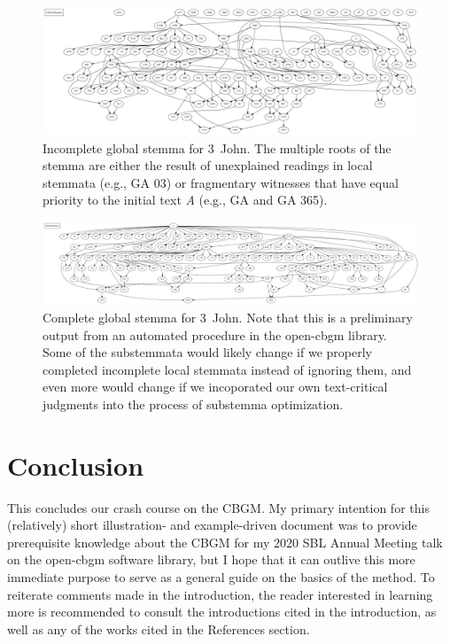 \documentclass[a4paper, 12pt]{article}
\begin{document}
	\begin{figure}
		\centering
		\includegraphics[width=\textwidth]{../graphics/global-stemma-incomplete.pdf}
		\caption{Incomplete global stemma for 3~John. The multiple roots of the stemma are either the result of unexplained readings in local stemmata (e.g., GA 03) or fragmentary witnesses that have equal priority to the initial text \emph{A} (e.g., GA  and GA 365).}
		\label{fig:global-stemma-incomplete}
	\end{figure}
	
	\begin{figure}
		\centering
		\includegraphics[width=\textwidth]{../graphics/global-stemma.pdf}
		\caption{Complete global stemma for 3~John. Note that this is a preliminary output from an automated procedure in the \textsf{open-cbgm} library. Some of the substemmata would likely change if we properly completed incomplete local stemmata instead of ignoring them, and even more would change if we incoporated our own text-critical judgments into the process of substemma optimization.}
		\label{fig:global-stemma}
	\end{figure}
	
	\newpage
	
	\section*{Conclusion}\label{sec:conclusion}
	This concludes our crash course on the CBGM. My primary intention for this (relatively) short illustration- and example-driven document was to provide prerequisite knowledge about the CBGM for my 2020 SBL Annual Meeting talk on the \textsf{open-cbgm} software library, but I hope that it can outlive this more immediate purpose to serve as a general guide on the basics of the method. To reiterate comments made in the introduction, the reader interested in learning more is recommended to consult the introductions cited in the introduction, as well as any of the works cited in the References section.
	
	\printbibliography
\end{document}
